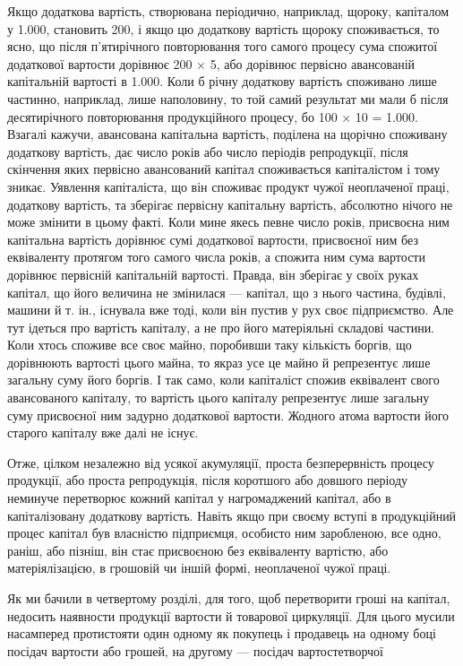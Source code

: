 Якщо додаткова вартість, створювана періодично, наприклад,
щороку, капіталом у \num{1.000}, становить 200, і якщо цю додаткову вартість щороку споживається,
то ясно, що після п’ятирічного повторювання того самого
процесу сума спожитої додаткової вартости дорівнює 200 × 5, або
дорівнює первісно авансованій капітальній вартості в \num{1.000}. Коли б річну додаткову вартість споживано лише
частинно, наприклад, лише наполовину, то той самий результат
ми мали б після десятирічного повторювання продукційного
процесу, бо 100 × 10 = \num{1.000}. Взагалі кажучи, авансована
капітальна вартість, поділена на щорічно споживану додаткову
вартість, дає число років або число періодів репродукції, після
скінчення яких первісно авансований капітал споживається
капіталістом і тому зникає. Уявлення капіталіста, що він споживає
продукт чужої неоплаченої праці, додаткову вартість,
та зберігає первісну капітальну вартість, абсолютно нічого не
може змінити в цьому факті. Коли мине якесь певне число років,
присвоєна ним капітальна вартість дорівнює сумі додаткової
вартости, присвоєної ним без еквіваленту протягом того самого
числа років, а спожита ним сума вартости дорівнює первісній
капітальній вартості. Правда, він зберігає у своїх руках капітал,
що його величина не змінилася — капітал, що з нього частина,
будівлі, машини й т. ін., існувала вже тоді, коли він пустив у рух
своє підприємство. Але тут ідеться про вартість капіталу, а не
про його матеріяльні складові частини. Коли хтось споживе
все своє майно, поробивши таку кількість боргів, що дорівнюють
вартості цього майна, то якраз усе це майно й репрезентує лише
загальну суму його боргів. І так само, коли капіталіст спожив
еквівалент свого авансованого капіталу, то вартість цього капіталу
репрезентує лише загальну суму присвоєної ним задурно
додаткової вартости. Жодного атома вартости його старого капіталу
вже далі не існує.

Отже, цілком незалежно від усякої акумуляції, проста безперервність
процесу продукції, або проста репродукція, після
коротшого або довшого періоду неминуче перетворює кожний
капітал у нагромаджений капітал, або в капіталізовану додаткову
вартість. Навіть якщо при своєму вступі в продукційний процес
капітал був власністю підприємця, особисто ним заробленою,
все одно, раніш, або пізніш, він стає присвоєною без еквіваленту
вартістю, або матеріялізацією, в грошовій чи іншій формі, неоплаченої
чужої праці.

Як ми бачили в четвертому розділі, для того, щоб перетворити
гроші на капітал, недосить наявности продукції вартости й товарової
циркуляції. Для цього мусили насамперед протистояти
один одному як покупець і продавець на одному боці посідач
вартости або грошей, на другому — посідач вартостетворчої
\parbreak{}  %
